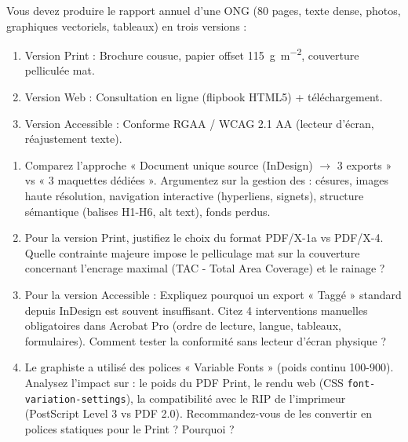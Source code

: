 \documentclass[11pt]{article}
\begin{document}
\begin{exercice}
Vous devez produire le rapport annuel d'une ONG (80 pages, texte dense, photos, graphiques vectoriels, tableaux) en trois versions :
\begin{enumerate}
    \item Version Print : Brochure cousue, papier offset \SI{115}{\gram\per\square\meter}, couverture pelliculée mat.
    \item Version Web : Consultation en ligne (flipbook HTML5) + téléchargement.
    \item Version Accessible : Conforme RGAA / WCAG 2.1 AA (lecteur d'écran, réajustement texte).
\end{enumerate}
\begin{enumerate}
    \item Comparez l'approche « Document unique source (InDesign) $\to$ 3 exports » vs « 3 maquettes dédiées ». Argumentez sur la gestion des : césures, images haute résolution, navigation interactive (hyperliens, signets), structure sémantique (balises H1-H6, alt text), fonds perdus.
    \item Pour la version Print, justifiez le choix du format PDF/X-1a vs PDF/X-4. Quelle contrainte majeure impose le pelliculage mat sur la couverture concernant l'encrage maximal (TAC - Total Area Coverage) et le rainage ?
    \item Pour la version Accessible : Expliquez pourquoi un export « Taggé » standard depuis InDesign est souvent insuffisant. Citez 4 interventions manuelles obligatoires dans Acrobat Pro (ordre de lecture, langue, tableaux, formulaires). Comment tester la conformité sans lecteur d'écran physique ?
    \item Le graphiste a utilisé des polices « Variable Fonts » (poids continu 100-900). Analysez l'impact sur : le poids du PDF Print, le rendu web (CSS \texttt{font-variation-settings}), la compatibilité avec le RIP de l'imprimeur (PostScript Level 3 vs PDF 2.0). Recommandez-vous de les convertir en polices statiques pour le Print ? Pourquoi ?
\end{enumerate}
\end{exercice}
\end{document}
